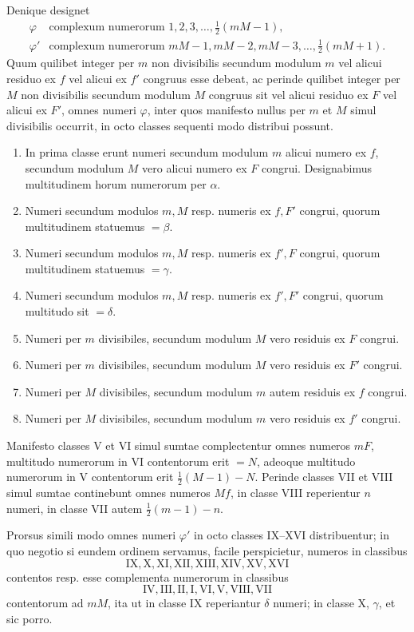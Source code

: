 \documentclass[12pt]{article}
\begin{document}
Denique designet
\[
\begin{array}{ll}
\varphi  & \text{complexum numerorum }1,2,3,\ldots,\frac12(mM-1),\\
\varphi' & \text{complexum numerorum }mM-1,mM-2,mM-3,\ldots,\frac12(mM+1).
\end{array}
\]
Quum quilibet integer per $m$ non divisibilis secundum modulum $m$ vel alicui residuo ex $f$ vel alicui ex $f'$ congruus esse debeat, ac perinde quilibet integer per $M$ non divisibilis secundum modulum $M$ congruus sit vel alicui residuo ex $F$ vel alicui ex $F'$, omnes numeri $\varphi$, inter quos manifesto nullus per $m$ et $M$ simul divisibilis occurrit, in octo classes sequenti modo distribui possunt.

\begin{enumerate}[label=\Roman*.]
\item In prima classe erunt numeri secundum modulum $m$ alicui numero ex $f$, secundum modulum $M$ vero alicui numero ex $F$ congrui. Designabimus multitudinem horum numerorum per $\alpha$.
\item Numeri secundum modulos $m,M$ resp. numeris ex $f,F'$ congrui, quorum multitudinem statuemus $=\beta$.
\item Numeri secundum modulos $m,M$ resp. numeris ex $f',F$ congrui, quorum multitudinem statuemus $=\gamma$.
\item Numeri secundum modulos $m,M$ resp. numeris ex $f',F'$ congrui, quorum multitudo sit $=\delta$.
\item Numeri per $m$ divisibiles, secundum modulum $M$ vero residuis ex $F$ congrui.
\item Numeri per $m$ divisibiles, secundum modulum $M$ vero residuis ex $F'$ congrui.
\item Numeri per $M$ divisibiles, secundum modulum $m$ autem residuis ex $f$ congrui.
\item Numeri per $M$ divisibiles, secundum modulum $m$ vero residuis ex $f'$ congrui.
\end{enumerate}

Manifesto classes V et VI simul sumtae complectentur omnes numeros $mF$, multitudo numerorum in VI contentorum erit $=N$, adeoque multitudo numerorum in V contentorum erit $\frac12(M-1)-N$. Perinde classes VII et VIII simul sumtae continebunt omnes numeros $Mf$, in classe VIII reperientur $n$ numeri, in classe VII autem $\frac12(m-1)-n$.

Prorsus simili modo omnes numeri $\varphi'$ in octo classes IX--XVI distribuentur; in quo negotio si eundem ordinem servamus, facile perspicietur, numeros in classibus
\[
\mathrm{IX},\mathrm{X},\mathrm{XI},\mathrm{XII},\mathrm{XIII},\mathrm{XIV},\mathrm{XV},\mathrm{XVI}
\]
contentos resp. esse complementa numerorum in classibus
\[
\mathrm{IV},\mathrm{III},\mathrm{II},\mathrm{I},\mathrm{VI},\mathrm{V},\mathrm{VIII},\mathrm{VII}
\]
contentorum ad $mM$, ita ut in classe IX reperiantur $\delta$ numeri; in classe X, $\gamma$, et sic porro.
\end{document}
